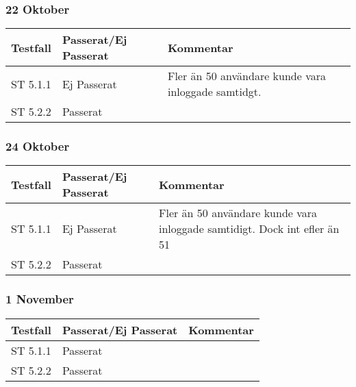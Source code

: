\documentclass[a4paper]{article}
\begin{document}
\subsubsection{22 Oktober}
\begin{tabular}{| l | l | p{9cm} |}
\hline
Testfall &  Passerat/Ej Passerat & Kommentar\\
\hline
ST 5.1.1 & Ej Passerat & Fler än 50 användare kunde vara inloggade samtidgt.\\
\hline
ST 5.2.2 & Passerat &\\
\hline
\end{tabular}

\subsubsection{24 Oktober}
\begin{tabular}{| l | l | p{9cm} |}
\hline
Testfall &  Passerat/Ej Passerat & Kommentar\\
\hline
ST 5.1.1 & Ej Passerat & Fler än 50 användare kunde vara inloggade samtidigt. Dock int efler än 51\\
\hline
ST 5.2.2 & Passerat & \\
\hline
\end{tabular}

\subsubsection{1 November}
\begin{tabular}{| l | l | p{9cm} |}
\hline
Testfall &  Passerat/Ej Passerat & Kommentar\\
\hline
ST 5.1.1 & Passerat & \\
\hline
ST 5.2.2 & Passerat & \\
\hline
\end{tabular}

\end{document}
